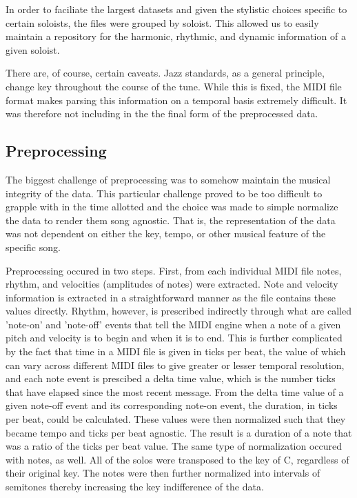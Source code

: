 \documentclass[conference]{IEEEtran}
\begin{document}
In order to faciliate the largest datasets and given the stylistic choices specific to certain soloists, the files were grouped by soloist. This allowed us to easily maintain a repository for the harmonic, rhythmic, and dynamic information of a given soloist.


There are, of course, certain caveats. Jazz standards, as a general principle, change key throughout the course of the tune. While this is fixed, the MIDI file format makes parsing this information on a temporal basis extremely difficult. It was therefore not including in the the final form of the preprocessed data.

\subsection{Preprocessing}
The biggest challenge of preprocessing was to somehow maintain the musical integrity of the data. This particular challenge proved to be too difficult to grapple with in the time allotted and the choice was made to simple normalize the data to render them song agnostic. That is, the representation of the data was not dependent on either the key, tempo, or other musical feature of the specific song.

Preprocessing occured in two steps. First, from each individual MIDI file notes, rhythm, and velocities (amplitudes of notes) were extracted. Note and velocity information is extracted in a straightforward manner as the file contains these values directly. Rhythm, however, is prescribed indirectly through what are called 'note-on' and 'note-off' events that tell the MIDI engine when a note of a given pitch and velocity is to begin and when it is to end. This is further complicated by the fact that time in a MIDI file is given in ticks per beat, the value of which can vary across different MIDI files to give greater or lesser temporal resolution, and each note event is prescibed a delta time value, which is the number ticks that have elapsed since the most recent message. From the delta time value of a given note-off event and its corresponding note-on event, the duration, in ticks per beat, could be calculated. These values were then normalized such that they became tempo and ticks per beat agnostic. The result is a duration of a note that was a ratio of the ticks per beat value. The same type of normalization occured with notes, as well. All of the solos were transposed to the key of C, regardless of their original key. The notes were then further normalized into intervals of semitones thereby increasing the key indifference of the data.
\end{document}
